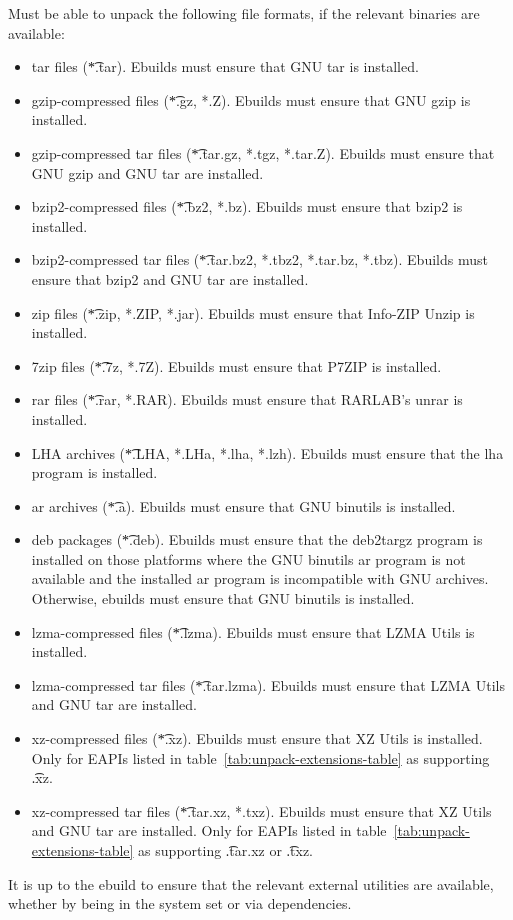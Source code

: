 \begin{description}
     Must be able to unpack the following file formats, if the
    relevant binaries are available:
    \begin{itemize}
    \item tar files (\t{*.tar}). Ebuilds must ensure that GNU tar is installed.
    \item gzip-compressed files (\t{*.gz, *.Z}). Ebuilds must ensure that GNU gzip is installed.
    \item gzip-compressed tar files (\t{*.tar.gz, *.tgz, *.tar.Z}). Ebuilds must ensure that
    GNU gzip and GNU tar are installed.
    \item bzip2-compressed files (\t{*.bz2, *.bz}). Ebuilds must ensure that bzip2 is installed.
    \item bzip2-compressed tar files (\t{*.tar.bz2, *.tbz2, *.tar.bz, *.tbz}). Ebuilds must ensure
    that bzip2 and GNU tar are installed.
    \item zip files (\t{*.zip, *.ZIP, *.jar}). Ebuilds must ensure that Info-ZIP Unzip is installed.
    \item 7zip files (\t{*.7z, *.7Z}). Ebuilds must ensure that P7ZIP is installed.
    \item rar files (\t{*.rar, *.RAR}). Ebuilds must ensure that RARLAB's unrar is installed.
    \item LHA archives (\t{*.LHA, *.LHa, *.lha, *.lzh}). Ebuilds must ensure that the lha program is
    installed.
    \item ar archives (\t{*.a}). Ebuilds must ensure that GNU binutils is installed.
    \item deb packages (\t{*.deb}). Ebuilds must ensure that the deb2targz program is installed on
    those platforms where the GNU binutils ar program is not available and the installed ar program is
    incompatible with GNU archives. Otherwise, ebuilds must ensure that GNU binutils is installed.
    \item lzma-compressed files (\t{*.lzma}). Ebuilds must ensure that LZMA Utils is installed.
    \item lzma-compressed tar files (\t{*.tar.lzma}). Ebuilds must ensure that LZMA Utils and
        GNU tar are installed.
    \item xz-compressed files (\t{*.xz}). Ebuilds must ensure that XZ Utils is installed. Only for
        EAPIs listed in table~\ref{tab:unpack-extensions-table} as supporting \t{.xz}.
    \item xz-compressed tar files (\t{*.tar.xz, *.txz}). Ebuilds must ensure that XZ Utils and
        GNU tar are installed. Only for EAPIs listed in table~\ref{tab:unpack-extensions-table} as
        supporting \t{.tar.xz} or \t{.txz}.
    \end{itemize}
    It is up to the ebuild to ensure that the relevant external utilities are available, whether by
    being in the system set or via dependencies.


\end{description}
